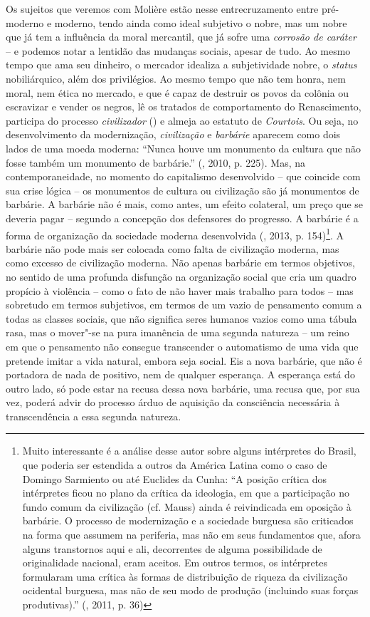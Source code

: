 Os sujeitos que veremos com Molière estão nesse
entrecruzamento entre pré-moderno e moderno, tendo ainda como ideal
subjetivo o nobre, mas um nobre que já tem a influência da moral
mercantil, que já sofre uma \emph{corrosão de caráter} -- e podemos
notar a lentidão das mudanças sociais, apesar de tudo. Ao mesmo tempo
que ama seu dinheiro, o mercador idealiza a subjetividade nobre, o
\emph{status} nobiliárquico, além dos privilégios. Ao mesmo tempo que
não tem honra, nem moral, nem ética no mercado, e que é capaz de
destruir os povos da colônia ou escravizar e vender os negros, lê os
tratados de comportamento do Renascimento, participa do processo
\emph{civilizador} () e almeja ao estatuto de \emph{Courtois}. Ou
seja, no desenvolvimento da modernização, \emph{civilização} e
\emph{barbárie} aparecem como dois lados de uma moeda moderna: ``Nunca
houve um monumento da cultura que não fosse também um monumento de
barbárie.'' (, 2010, p. 225). Mas, na contemporaneidade, no
momento do capitalismo desenvolvido -- que coincide com sua crise lógica
-- os monumentos de cultura ou civilização são já monumentos de
barbárie. A barbárie não é mais, como antes, um efeito colateral, um
preço que se deveria pagar -- segundo a concepção dos defensores do
progresso. A barbárie é a forma de organização da sociedade moderna
desenvolvida (, 2013, p. 154)\footnote{Muito interessante é a
  análise desse autor sobre alguns intérpretes do Brasil, que poderia
  ser estendida a outros da América Latina como o caso de Domingo
  Sarmiento ou até Euclides da Cunha: ``A posição crítica dos
  intérpretes ficou no plano da crítica da ideologia, em que a
  participação no fundo comum da civilização (cf. Mauss) ainda é
  reivindicada em oposição à barbárie. O processo de modernização e a
  sociedade burguesa são criticados na forma que assumem na periferia,
  mas não em seus fundamentos que, afora alguns transtornos aqui e ali,
  decorrentes de alguma possibilidade de originalidade nacional, eram
  aceitos. Em outros termos, os intérpretes formularam uma crítica às
  formas de distribuição de riqueza da civilização ocidental burguesa,
  mas não de seu modo de produção (incluindo suas forças produtivas).''
  (, 2011, p. 36)}. A barbárie não pode mais ser colocada como
falta de civilização moderna, mas como excesso de civilização moderna.
Não apenas barbárie em termos objetivos, no sentido de uma profunda
disfunção na organização social que cria um quadro propício à violência
-- como o fato de não haver mais trabalho para todos -- mas sobretudo em
termos subjetivos, em termos de um vazio de pensamento comum a todas as
classes sociais, que não significa seres humanos vazios como uma tábula
rasa, mas o mover"-se na pura imanência de uma segunda natureza -- um
reino em que o pensamento não consegue transcender o automatismo de uma
vida que pretende imitar a vida natural, embora seja social. Eis a nova
barbárie, que não é portadora de nada de positivo, nem de qualquer
esperança. A esperança está do outro lado, só pode estar na recusa dessa
nova barbárie, uma recusa que, por sua vez, poderá advir do processo
árduo de aquisição da consciência necessária à transcendência a essa
segunda natureza.

